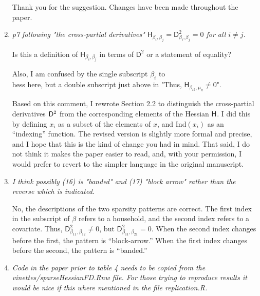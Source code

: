 \documentclass{article}
\newcommand{\parD}[3]{\mathsf{D}^{#1}_{#2}#3}
\newcommand{\hess}[2]{\mathsf{H}_{#1}#2}
\newenvironment{revQuote}{\itshape}{\vspace{\baselineskip}}
\newenvironment{response}{\normalfont}{\vspace{\baselineskip}}
\begin{document}
\begin{enumerate}
\begin{response}
  Thank you for the suggestion.  Changes have been made throughout the paper.
\end{response}


\item \begin{revQuote}
p7 following "the cross-partial derivatives"
$\hess{\beta_i,\beta_j}{}=\parD{2}{\beta_i, \beta_j}{}=0$ for all $i\neq
j$.  

  Is this a definition of $\hess{\beta_i,\beta_j}{}$ in terms of  $\parD{2}{}{}$
or a statement of equality?
  
  Also, I am confused by the single subscript $\beta_i$ to \\hess here, but a
double subscript just above in "Thus, $\hess{\beta_{ik},\mu_k}{}\neq 0$".
  \end{revQuote}

\begin{response}
  Based on this comment, I rewrote Section 2.2 to distinguish the
  cross-partial derivatives $\parD{2}{}$ from the corresponding
  elements of the Hessian $\hess{}{}$.  I did this by defining $x_i$ as
  a subset of the elements of $x$, and Ind$(x_i)$ as an 
  ``indexing'' function.  The revised version is slightly more formal
  and precise, and I hope that this is the kind of change you had in
  mind.  That said, I do not think it makes the paper easier to read,
  and, with your permission, I would prefer to revert to the simpler
  language in the original manuscript.
\end{response}


\item \begin{revQuote}
 I think possibly (16) is "banded" and (17) "block arrow" rather than the
reverse which is indicated.
  \end{revQuote}

\begin{response}
No, the descriptions of the two sparsity patterns are correct. The
first index in the subscript of $\beta$ refers to a household, and the
second index refers to a covariate. Thus,
$\parD{2}{\beta_{11},\beta_{12}}\neq 0$, but
$\parD{2}{\beta_{11},\beta_{21}}=0$.  When the second index changes
before the first, the pattern is ``block-arrow.''  When the first
index changes before the second, the pattern is ``banded.''
  
\end{response}


\item \begin{revQuote}
Code in the paper prior to table 4 needs to be copied from the
vinettes/sparseHessianFD.Rnw file. For those trying to reproduce results it
would be nice if this where mentioned in the file replication.R.
  \end{revQuote}


\end{enumerate}
\end{document}
